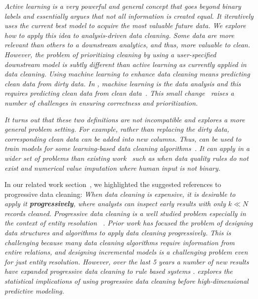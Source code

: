\emph{Active learning is a very powerful and general concept that goes beyond binary labels and essentially argues that not all information is created equal.
It iteratively uses the current best model to acquire the most valuable future data.
We explore how to apply this idea to analysis-driven data cleaning. 
Some data are more relevant than others to a downstream analytics, and thus, more valuable to clean.
However, the problem of prioritizing cleaning by using a user-specified downstream model is subtly different than active learning as currently applied in data cleaning.
Using machine learning to enhance data cleaning means predicting clean data from dirty data.
In \sys, machine learning is the data analysis and this requires predicting clean data from \emph{clean data}~. 
This small change~ raises a number of challenges in ensuring correctness and prioritization.}

\emph{It turns out that these two definitions are not incompatible and \sys explores a more general problem setting.
For example, rather than replacing the dirty data, corresponding clean data can be added into new columns. 
Thus, \sys can be used to train models for some learning-based data cleaning algorithms~.
It can apply in a wider set of problems than existing work~ such as when data quality rules do not exist and numerical value imputation where human input is not binary.}

\vspace{0.5em}
In our related work section~, we highlighted the suggested references to progressive data cleaning:
\emph{When data cleaning is expensive, it is desirable to apply it \textbf{progressively}, where analysts can inspect early results with only $k \ll N$ records cleaned.
Progressive data cleaning is a well studied problem especially in the context of entity resolution \cite{altowim2014progressive, whang2014incremental, papenbrock2015progressive, gruenheid2014incremental}~.
Prior work has focused the problem of designing data structures and algorithms to apply data cleaning progressively.
This is challenging because many data cleaning algorithms require information from entire relations, and designing incremental models is a challenging problem even for just entity resolution.
However, over the last 5 years a number of new results have expanded progressive data cleaning to rule based systems \cite{mayfield2010eracer, DBLP:journals/pvldb/YakoutENOI11, yakout2013don}.
\sys explores the statistical implications of using progressive data cleaning before high-dimensional predictive modeling.}

